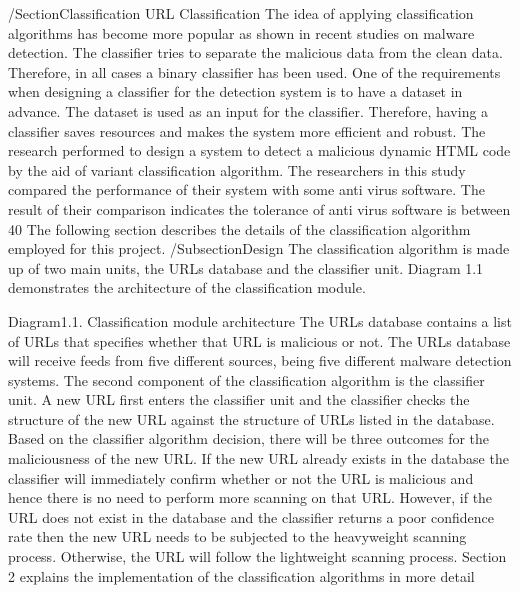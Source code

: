 /Section{Classification}
URL Classification
The idea of applying classification algorithms has become more popular as shown in recent studies on malware detection. The classifier tries to separate the malicious data from the clean data. Therefore, in all cases a binary classifier has been used. One of the requirements when designing a classifier for the detection system is to have a dataset in advance. The dataset is used as an input for the classifier. Therefore, having a classifier saves resources and makes the system more efficient and robust.
The research performed to design a system to detect a malicious dynamic HTML code by the aid of variant classification algorithm. The researchers in this study compared the performance of their system with some anti virus software. The result of their comparison indicates the tolerance of anti virus software is between 40%
 The following section describes the details of the classification algorithm employed for this project. 
/Subsection{Design}
The classification algorithm is made up of two main units, the URLs database and the classifier unit. Diagram 1.1 demonstrates the architecture of the classification module.


Diagram1.1. Classification module architecture
The URLs database contains a list of URLs that specifies whether that URL is malicious or not. The URLs database will receive feeds from five different sources, being five different malware detection systems.
The second component of the classification algorithm is the classifier unit. A new URL first enters the classifier unit and the classifier checks the structure of the new URL against the structure of URLs listed in the database. Based on the classifier algorithm decision, there will be three outcomes for the maliciousness of the new URL. If the new URL already exists in the database the classifier will immediately confirm whether or not the URL is malicious and hence there is no need to perform more scanning on that URL. However, if the URL does not exist in the database and the classifier returns a poor confidence rate then the new URL needs to be subjected to the heavyweight scanning process. Otherwise, the URL will follow the lightweight scanning process. Section 2 explains the implementation of the classification algorithms in more detail

